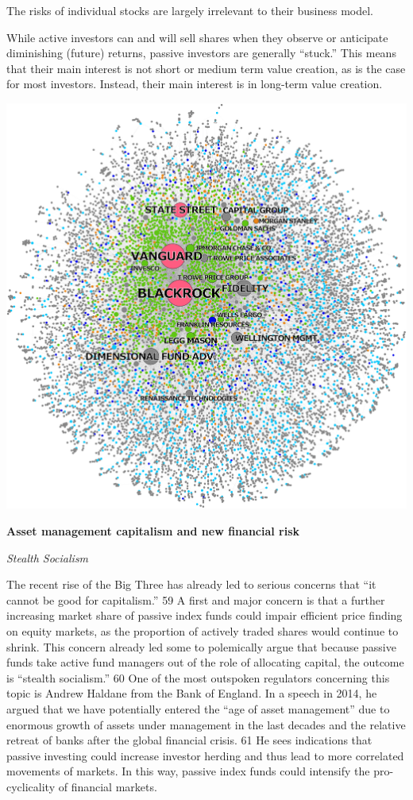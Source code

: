 \documentclass[
]{book}
\begin{document}
The risks of individual stocks are largely irrelevant to their business model.

While active investors can and will sell shares when they observe or anticipate diminishing (future) returns, passive investors are generally ``stuck.'' This means that their main interest is not short or medium term value creation, as is the case for most investors. Instead, their main interest is in long-term value creation.

\includegraphics{fig/big3_ownership_map.jpeg}

\textbf{Asset management capitalism and new financial risk}

\emph{Stealth Socialism}

The recent rise of the Big Three has already led to serious concerns that ``it cannot be good for capitalism.'' 59 A first and major concern is that a further increasing market share of passive index funds could impair efficient price finding on equity markets, as the proportion of actively traded shares would continue to shrink. This concern already led some to polemically argue that because passive funds take active fund managers out of the role of allocating capital, the outcome is ``stealth socialism.'' 60 One of the most outspoken regulators concerning this topic is Andrew Haldane from the Bank of England. In a speech in 2014, he argued that we have potentially entered the ``age of asset management'' due to enormous growth of assets under management in the last decades and the relative retreat of banks after the global financial crisis. 61 He sees indications that passive investing could increase investor herding and thus lead to more correlated movements of markets. In this way, passive index funds could intensify the pro-cyclicality of financial markets.
\end{document}
